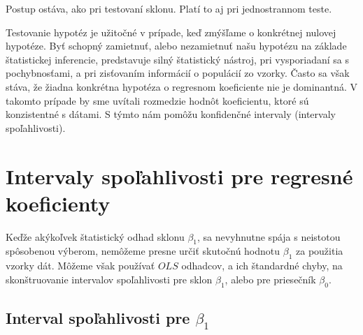 \documentclass[]{tukediphc}
\begin{document}
Postup ostáva, ako pri testovaní sklonu. Platí to aj pri jednostrannom teste.

Testovanie hypotéz je užitočné v prípade, keď zmýšľame o konkrétnej nulovej hypotéze. Byť schopný zamietnuť, alebo nezamietnuť našu hypotézu na základe štatistickej inferencie, predstavuje silný štatistický nástroj, pri vysporiadaní sa s pochybnosťami, a pri zisťovaním informácií o populácií zo vzorky. Často sa však stáva, že žiadna konkrétna hypotéza o regresnom koeficiente nie je dominantná. V takomto prípade by sme uvítali rozmedzie hodnôt koeficientu, ktoré sú konzistentné s dátami. S týmto nám pomôžu konfidenčné intervaly (intervaly spoľahlivosti). 

\section{Intervaly spoľahlivosti pre regresné koeficienty}

Keďže akýkoľvek štatistický odhad sklonu $\beta_{1}$, sa nevyhnutne spája s neistotou spôsobenou výberom, nemôžeme presne určiť skutočnú hodnotu $\beta_{1}$ za použitia vzorky dát. Môžeme však používať $OLS$ odhadcov, a ich štandardné chyby, na skonštruovanie intervalov spoľahlivosti pre sklon $\beta_{1}$, alebo pre priesečník $\beta_{0}$. 

\subsection{Interval spoľahlivosti pre $\beta_{1}$}





%

%

%

%

%

%

%
\newpage
{}
\protect\label{page:posledna}
\end{document}
